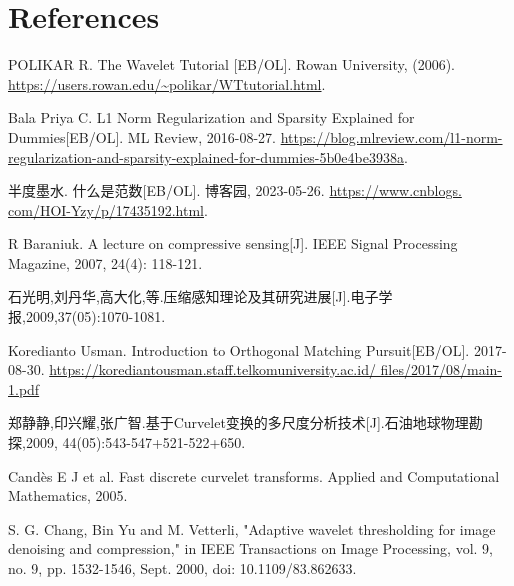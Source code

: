 \documentclass[10pt,a4paper,oneside,numbers=noenddot]{scrbook}
\theoremstyle{ctplain}
\theoremstyle{ctresult}
\begin{document}
\chapter*{References}
\begin{enumerate}[label={[\arabic*]}, leftmargin=0pt]
  \raggedright
  \item POLIKAR R. The Wavelet Tutorial [EB/OL]. Rowan University, (2006).
  \url{https://users.rowan.edu/~polikar/WTtutorial.html}.
  \item Bala Priya C. L1 Norm Regularization and Sparsity Explained for Dummies[EB/OL].
  ML Review, 2016-08-27. \url{https://blog.mlreview.com/l1-norm-
  regularization-and-sparsity-explained-for-dummies-5b0e4be3938a}.
  \item 半度墨水. 什么是范数[EB/OL]. 博客园, 2023-05-26. \url{https://www.cnblogs.
  com/HOI-Yzy/p/17435192.html}.
  \item R Baraniuk. A lecture on compressive sensing[J]. IEEE Signal Processing Magazine,
  2007, 24(4): 118-121.
  \item 石光明,刘丹华,高大化,等.压缩感知理论及其研究进展[J].电子学报,2009,37(05):1070-1081.
  \item Koredianto Usman. Introduction to Orthogonal Matching Pursuit[EB/OL].
  2017-08-30. \url{https://korediantousman.staff.telkomuniversity.ac.id/
  files/2017/08/main-1.pdf}
  \item 郑静静,印兴耀,张广智.基于Curvelet变换的多尺度分析技术[J].石油地球物理勘探,2009,
  44(05):543-547+521-522+650.
  \item Candès E J et al. Fast discrete curvelet transforms. Applied and Computational
  Mathematics, 2005.
  \item S. G. Chang, Bin Yu and M. Vetterli, "Adaptive wavelet thresholding for image
  denoising and compression," in IEEE Transactions on Image Processing, vol. 9, no. 9,
  pp. 1532-1546, Sept. 2000, doi: 10.1109/83.862633.
\end{enumerate}
\end{document}
